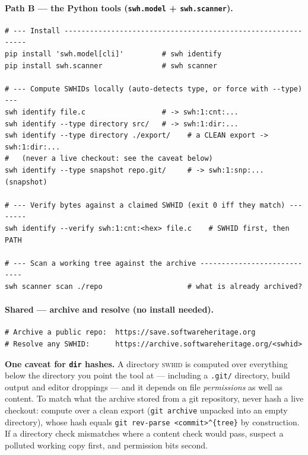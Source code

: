 \paragraph{Path B --- the Python tools (\texttt{swh.model} + \texttt{swh.scanner}).}
\begin{verbatim}
# --- Install -------------------------------------------------------------
pip install 'swh.model[cli]'         # swh identify
pip install swh.scanner              # swh scanner

# --- Compute SWHIDs locally (auto-detects type, or force with --type) ---
swh identify file.c                  # -> swh:1:cnt:...
swh identify --type directory src/   # -> swh:1:dir:...
swh identify --type directory ./export/    # a CLEAN export -> swh:1:dir:...
#   (never a live checkout: see the caveat below)
swh identify --type snapshot repo.git/     # -> swh:1:snp:...  (snapshot)

# --- Verify bytes against a claimed SWHID (exit 0 iff they match) --------
swh identify --verify swh:1:cnt:<hex> file.c    # SWHID first, then PATH

# --- Scan a working tree against the archive ----------------------------
swh scanner scan ./repo                    # what is already archived?
\end{verbatim}

\paragraph{Shared --- archive and resolve (no install needed).}
\begin{verbatim}
# Archive a public repo:  https://save.softwareheritage.org
# Resolve any SWHID:      https://archive.softwareheritage.org/<swhid>
\end{verbatim}

\noindent\textbf{One caveat for \texttt{dir} hashes.} A directory \textsc{swhid} is computed over
everything below the directory you point the tool at --- including a \texttt{.git/} directory,
build output and editor droppings --- and it depends on file \emph{permissions} as well as
content. To match what the archive stored from a git repository, never hash a live checkout:
compute over a clean export (\texttt{git archive} unpacked into an empty directory), whose hash
equals \verb|git rev-parse <commit>^{tree}| by construction. If a directory check mismatches
where a content check would pass, suspect a polluted working copy first, and permission bits
second.
